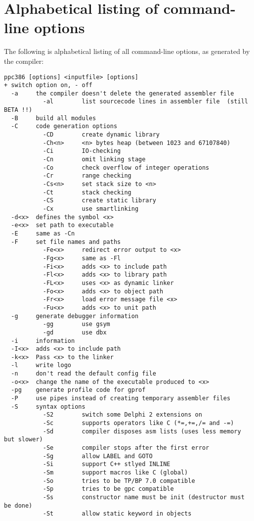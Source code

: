 \documentclass{report}
\begin{document}
\chapter{Alphabetical listing of command-line options}
The following is alphabetical listing of all command-line options, as
generated by the compiler:
\begin{verbatim}
ppc386 [options] <inputfile> [options]
+ switch option on, - off
  -a     the compiler doesn't delete the generated assembler file
           -al        list sourcecode lines in assembler file  (still BETA !!)
  -B     build all modules
  -C     code generation options
           -CD        create dynamic library
           -Ch<n>     <n> bytes heap (between 1023 and 67107840)
           -Ci        IO-checking
           -Cn        omit linking stage
           -Co        check overflow of integer operations
           -Cr        range checking
           -Cs<n>     set stack size to <n>
           -Ct        stack checking
           -CS        create static library
           -Cx        use smartlinking
  -d<x>  defines the symbol <x>
  -e<x>  set path to executable
  -E     same as -Cn
  -F     set file names and paths
           -Fe<x>     redirect error output to <x>
           -Fg<x>     same as -Fl
           -Fi<x>     adds <x> to include path
           -Fl<x>     adds <x> to library path
           -FL<x>     uses <x> as dynamic linker
           -Fo<x>     adds <x> to object path
           -Fr<x>     load error message file <x>
           -Fu<x>     adds <x> to unit path
  -g     generate debugger information
           -gg        use gsym
           -gd        use dbx
  -i     information
  -I<x>  adds <x> to include path
  -k<x>  Pass <x> to the linker
  -l     write logo
  -n     don't read the default config file
  -o<x>  change the name of the executable produced to <x>
  -pg    generate profile code for gprof
  -P     use pipes instead of creating temporary assembler files
  -S     syntax options
           -S2        switch some Delphi 2 extensions on
           -Sc        supports operators like C (*=,+=,/= and -=)
           -Sd        compiler disposes asm lists (uses less memory but slower)
           -Se        compiler stops after the first error
           -Sg        allow LABEL and GOTO
           -Si        support C++ stlyed INLINE
           -Sm        support macros like C (global)
           -So        tries to be TP/BP 7.0 compatible
           -Sp        tries to be gpc compatible
           -Ss        constructor name must be init (destructor must be done)
           -St        allow static keyword in objects

\end{verbatim}
\end{document}
